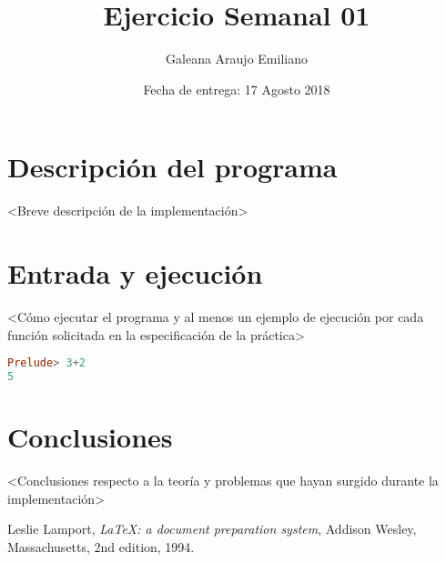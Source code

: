 \documentclass{article}
\title{Ejercicio Semanal 01}
\author{Galeana Araujo Emiliano}
\affil{Facultad de Ciencias, UNAM}
\date{Fecha de entrega: 17 Agosto 2018}
\begin{document}
\maketitle

\section{Descripción del programa}

\textless Breve descripción de la implementación\textgreater

\section{Entrada y ejecución}

\textless Cómo ejecutar el programa y al menos un ejemplo de ejecución por cada función solicitada en la especificación de la práctica\textgreater

\begin{lstlisting}[language=Haskell]
Prelude> 3+2
5
\end{lstlisting}

\section{Conclusiones}

\textless Conclusiones respecto a la teoría y problemas que hayan surgido durante la implementación\textgreater


\begin{thebibliography}{9}

  Leslie Lamport,
  \emph{\LaTeX: a document preparation system},
  Addison Wesley, Massachusetts,
  2nd edition,
  1994.

\end{thebibliography}
\end{document}
